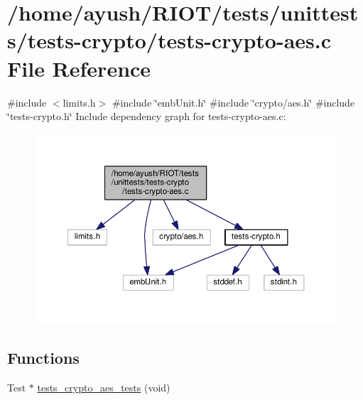 \hypertarget{tests-crypto-aes_8c}{}\section{/home/ayush/\+R\+I\+O\+T/tests/unittests/tests-\/crypto/tests-\/crypto-\/aes.c File Reference}
\label{tests-crypto-aes_8c}
{\ttfamily \#include $<$limits.\+h$>$}\newline
{\ttfamily \#include \char`\"{}emb\+Unit.\+h\char`\"{}}\newline
{\ttfamily \#include \char`\"{}crypto/aes.\+h\char`\"{}}\newline
{\ttfamily \#include \char`\"{}tests-\/crypto.\+h\char`\"{}}\newline
Include dependency graph for tests-\/crypto-\/aes.c\+:
\nopagebreak
\begin{figure}[H]
\begin{center}
\leavevmode
\includegraphics[width=350pt]{tests-crypto-aes_8c__incl}
\end{center}
\end{figure}
\subsection*{Functions}
\begin{DoxyCompactItemize}
\item 
Test $\ast$ \hyperlink{group__unittests_ga19bbedd30b2147c5418e225af2ce5d73}{tests\+\_\+crypto\+\_\+aes\+\_\+tests} (void)
\end{DoxyCompactItemize}
